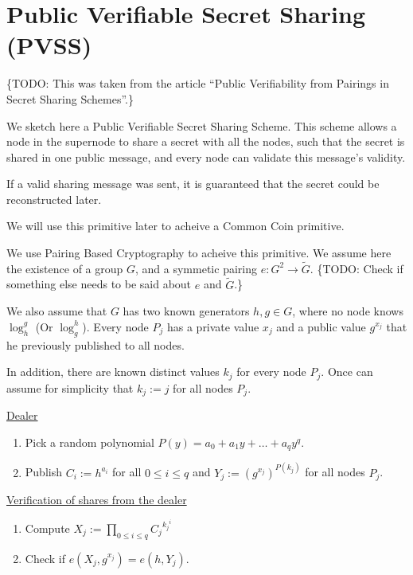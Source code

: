 \section{Public Verifiable Secret Sharing (PVSS)}

\{TODO: This was taken from the article ``Public Verifiability from Pairings in
Secret Sharing Schemes''.\}

We sketch here a Public Verifiable Secret Sharing Scheme. This scheme allows a
node in the supernode to share a secret with all the nodes, such that the secret
is shared in one public message, and every node can validate this message's
validity. 

If a valid sharing message was sent, it is guaranteed that the secret could be
reconstructed later. 

We will use this primitive later to acheive a Common Coin primitive.

We use Pairing Based Cryptography to acheive this primitive. We assume here the
existence of a group $G$, and a symmetic pairing $e:G^2 \to \tilde{G}$.
\{TODO: Check if something else needs to be said about $e$ and $\tilde{G}$.\}

We also assume that $G$ has two known generators $h,g \in G$, where no node
knows $\log_h^g$ (Or $\log_g^h$). Every node $P_j$ has a private value $x_j$ and
a public value $g^{x_j}$ that he previously published to all nodes. 

In addition, there are known distinct values $k_j$ for every node $P_j$. Once
can assume for simplicity that $k_j := j$ for all nodes $P_j$.

\uline{Dealer}
\begin{enumerate}
  \item Pick a random polynomial $P(y) = {a_0} + {a_1}y + \ldots + {a_q}y^q$.
  \item Publish $C_i := h^{a_i}$ for all $0 \leq i \leq q$ and $Y_j :=
    \left(g^{x_j}\right)^{P(k_j)}$ for all nodes $P_j$.
\end{enumerate}

\uline{Verification of shares from the dealer}
\begin{enumerate}
  \item Compute $X_j := {\prod}_{0 \leq i \leq q}{{C_j}^{{k_j}^i}}$
  \item Check if $e(X_j,g^{x_j}) = e(h,Y_j)$.
\end{enumerate}

